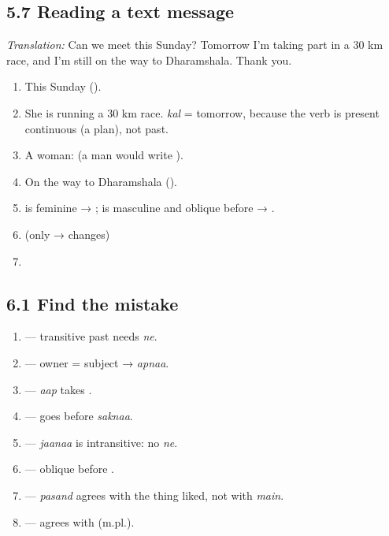 \subsection{5.7 Reading a text message}
\textit{Translation:} Can we meet this Sunday? Tomorrow I'm taking part in a 30 km race, and I'm still on the way to Dharamshala. Thank you.
\begin{enumerate}
  \item This Sunday ().
  \item She is running a 30 km race. \emph{kal} = tomorrow, because the verb is present continuous (a plan), not past.
  \item A woman:  (a man would write ).
  \item On the way to Dharamshala ().
  \item {} is feminine → ;  is masculine and oblique before  → .
  \item {} (only  →  changes)
  \item {}
\end{enumerate}

\subsection{6.1 Find the mistake}
\begin{enumerate}
  \item {} — transitive past needs \textit{ne}.
  \item {} — owner = subject → \textit{apnaa}.
  \item {} — \textit{aap} takes .
  \item {} —  goes before \textit{saknaa}.
  \item {} — \textit{jaanaa} is intransitive: no \textit{ne}.
  \item {} — oblique before .
  \item {} — \textit{pasand} agrees with the thing liked, not with \textit{main}.
  \item {} — agrees with  (m.pl.).
\end{enumerate}

